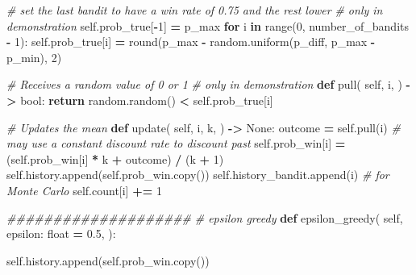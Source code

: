 \documentclass[
]{book}
\newenvironment{Shaded}{\begin{snugshade}}{\end{snugshade}}
\newcommand{\BuiltInTok}[1]{#1}
\newcommand{\CommentTok}[1]{\textcolor[rgb]{0.56,0.35,0.01}{\textit{#1}}}
\newcommand{\ControlFlowTok}[1]{\textcolor[rgb]{0.13,0.29,0.53}{\textbf{#1}}}
\newcommand{\DecValTok}[1]{\textcolor[rgb]{0.00,0.00,0.81}{#1}}
\newcommand{\FloatTok}[1]{\textcolor[rgb]{0.00,0.00,0.81}{#1}}
\newcommand{\KeywordTok}[1]{\textcolor[rgb]{0.13,0.29,0.53}{\textbf{#1}}}
\newcommand{\NormalTok}[1]{#1}
\newcommand{\OperatorTok}[1]{\textcolor[rgb]{0.81,0.36,0.00}{\textbf{#1}}}
\newcommand{\VariableTok}[1]{\textcolor[rgb]{0.00,0.00,0.00}{#1}}
\theoremstyle{definition}
\theoremstyle{definition}
\theoremstyle{definition}
\theoremstyle{definition}
\theoremstyle{remark}
\begin{document}
\begin{Shaded}
\begin{Highlighting}[]
        \CommentTok{\# set the last bandit to have a win rate of 0.75 and the rest lower}
        \CommentTok{\# only in demonstration}
        \VariableTok{self}\NormalTok{.prob\_true[}\OperatorTok{{-}}\DecValTok{1}\NormalTok{] }\OperatorTok{=}\NormalTok{ p\_max}
        \ControlFlowTok{for}\NormalTok{ i }\KeywordTok{in} \BuiltInTok{range}\NormalTok{(}\DecValTok{0}\NormalTok{, number\_of\_bandits }\OperatorTok{{-}} \DecValTok{1}\NormalTok{):}
            \VariableTok{self}\NormalTok{.prob\_true[i] }\OperatorTok{=} \BuiltInTok{round}\NormalTok{(p\_max }\OperatorTok{{-}}\NormalTok{ random.uniform(p\_diff, p\_max }\OperatorTok{{-}}\NormalTok{ p\_min), }\DecValTok{2}\NormalTok{)}

    \CommentTok{\# Receives a random value of 0 or 1}
    \CommentTok{\# only in demonstration}
    \KeywordTok{def}\NormalTok{ pull(}
            \VariableTok{self}\NormalTok{,}
\NormalTok{            i,}
\NormalTok{    ) }\OperatorTok{{-}\textgreater{}} \BuiltInTok{bool}\NormalTok{:}
        \ControlFlowTok{return}\NormalTok{ random.random() }\OperatorTok{\textless{}} \VariableTok{self}\NormalTok{.prob\_true[i]}

    \CommentTok{\# Updates the mean}
    \KeywordTok{def}\NormalTok{ update(}
            \VariableTok{self}\NormalTok{,}
\NormalTok{            i,}
\NormalTok{            k,}
\NormalTok{    ) }\OperatorTok{{-}\textgreater{}} \VariableTok{None}\NormalTok{:}
\NormalTok{        outcome }\OperatorTok{=} \VariableTok{self}\NormalTok{.pull(i)}
        \CommentTok{\# may use a constant discount rate to discount past}
        \VariableTok{self}\NormalTok{.prob\_win[i] }\OperatorTok{=}\NormalTok{ (}\VariableTok{self}\NormalTok{.prob\_win[i] }\OperatorTok{*}\NormalTok{ k }\OperatorTok{+}\NormalTok{ outcome) }\OperatorTok{/}\NormalTok{ (k }\OperatorTok{+} \DecValTok{1}\NormalTok{)}
        \VariableTok{self}\NormalTok{.history.append(}\VariableTok{self}\NormalTok{.prob\_win.copy())}
        \VariableTok{self}\NormalTok{.history\_bandit.append(i)  }\CommentTok{\# for Monte Carlo}
        \VariableTok{self}\NormalTok{.count[i] }\OperatorTok{+=} \DecValTok{1}

    \CommentTok{\#\#\#\#\#\#\#\#\#\#\#\#\#\#\#\#\#\#\#\#}
    \CommentTok{\# epsilon greedy}
    \KeywordTok{def}\NormalTok{ epsilon\_greedy(}
            \VariableTok{self}\NormalTok{,}
\NormalTok{            epsilon: }\BuiltInTok{float} \OperatorTok{=} \FloatTok{0.5}\NormalTok{,}
\NormalTok{    ):}

        \VariableTok{self}\NormalTok{.history.append(}\VariableTok{self}\NormalTok{.prob\_win.copy())}


\end{Highlighting}
\end{Shaded}
\end{document}
